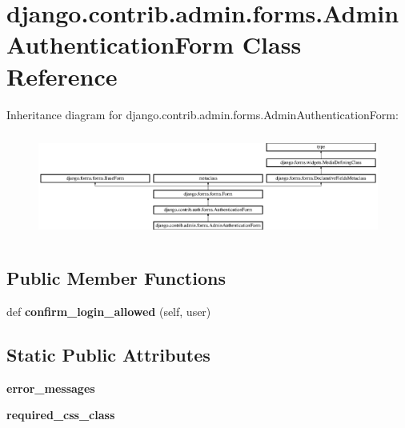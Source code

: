 \hypertarget{classdjango_1_1contrib_1_1admin_1_1forms_1_1_admin_authentication_form}{}\section{django.\+contrib.\+admin.\+forms.\+Admin\+Authentication\+Form Class Reference}
\label{classdjango_1_1contrib_1_1admin_1_1forms_1_1_admin_authentication_form}
Inheritance diagram for django.\+contrib.\+admin.\+forms.\+Admin\+Authentication\+Form\+:\begin{figure}[H]
\begin{center}
\leavevmode
\includegraphics[height=3.489097cm]{classdjango_1_1contrib_1_1admin_1_1forms_1_1_admin_authentication_form}
\end{center}
\end{figure}
\subsection*{Public Member Functions}
\begin{DoxyCompactItemize}
\item 
\mbox{\label{classdjango_1_1contrib_1_1admin_1_1forms_1_1_admin_authentication_form_ac34a3509d4259931eb33fd8b4503b81e}} 
def {\bfseries confirm\+\_\+login\+\_\+allowed} (self, user)
\end{DoxyCompactItemize}
\subsection*{Static Public Attributes}
\begin{DoxyCompactItemize}
\item 
\mbox{\label{classdjango_1_1contrib_1_1admin_1_1forms_1_1_admin_authentication_form_adf88c639c851b9d07539464e54019d02}} 
{\bfseries error\+\_\+messages}
\item 
\mbox{\label{classdjango_1_1contrib_1_1admin_1_1forms_1_1_admin_authentication_form_a268cd081a62182d344096655c4267a61}} 
{\bfseries required\+\_\+css\+\_\+class}
\end{DoxyCompactItemize}
